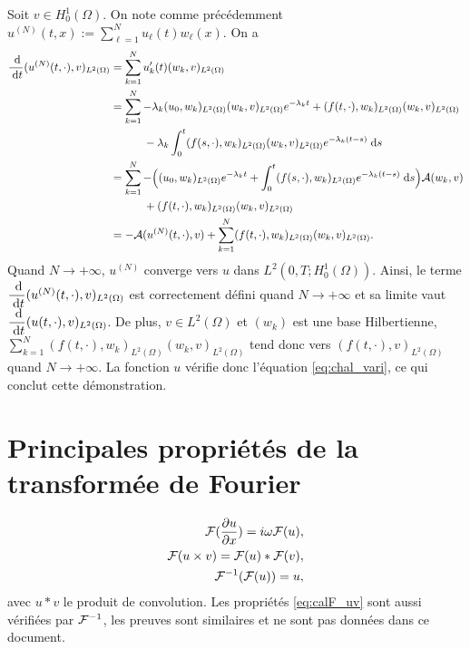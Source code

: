 \documentclass[12pt,a4paper,twoside]{article}
\begin{document}
Soit $v \in H_0^1(\Omega)$. On note comme pr\'ec\'edemment
$u^{(N)} (t,x) := \sum_{\ell=1}^N u_{\ell}(t) w_{\ell}(x)$.
On a 
\begin{align*}
  \dfrac{\;\mathrm{d}}{\;\mathrm{d} t} ( u^{(N)}(t,\cdot) , v )_{L^2(\Omega)}
  &= \sum_{k=1}^N u_k'(t) (w_k , v )_{L^2(\Omega)}
  \\
  &= \sum_{k=1}^N - \lambda_k (u_0 , w_k)_{L^2(\Omega)} (w_k , v )_{L^2(\Omega)} e^{-\lambda_k t}
    + ( f(t,\cdot) , w_k )_{L^2(\Omega)} ( w_k , v )_{L^2(\Omega)}
  \\
  & \qquad \quad 
    - \lambda_k \int_{0}^t (f(s,\cdot) , w_k)_{L^2(\Omega)} ( w_k , v )_{L^2(\Omega)} 
    e^{-\lambda_k (t-s)} \;\mathrm{d} s
  \\
  &= \sum_{k=1}^N - \Big( (u_0 , w_k)_{L^2(\Omega)} e^{-\lambda_k t} 
    + \int_{0}^t (f(s,\cdot) , w_k)_{L^2(\Omega)} e^{-\lambda_k (t-s)} \;\mathrm{d} s  \Big)
    \mathcal{A}(w_k , v)
  \\
  & \qquad \quad 
    + ( f(t,\cdot) , w_k )_{L^2(\Omega)} ( w_k , v )_{L^2(\Omega)}
  \\
  &= - \mathcal{A}(u^{(N)}(t,\cdot) , v) 
    + \sum_{k=1}^N ( f(t,\cdot) , w_k )_{L^2(\Omega)} ( w_k , v )_{L^2(\Omega)} .
\end{align*}
Quand $N \to +\infty$, $u^{(N)}$ converge vers $u$ dans $L^2(0,T;H^1_0(\Omega))$.
Ainsi, le terme $\dfrac{\;\mathrm{d}}{\;\mathrm{d} t}( u^{(N)}(t,\cdot) , v)_{L^2(\Omega)}$
est correctement d\'efini quand $N \to +\infty$ et sa limite vaut 
$\dfrac{\;\mathrm{d}}{\;\mathrm{d} t}(u(t,\cdot) , v)_{L^2(\Omega)}$.
De plus, $v \in L^2(\Omega)$ et $(w_k)$ est une base Hilbertienne,
$\sum_{k=1}^N ( f(t,\cdot) , w_k )_{L^2(\Omega)} ( w_k , v )_{L^2(\Omega)}$
tend donc vers $(f(t,\cdot),v)_{L^2(\Omega)}$ quand $N \to +\infty$.
La fonction $u$ v\'erifie donc l'\'equation \eqref{eq:chal_vari},
ce qui conclut cette d\'emonstration.


\appendix
\section{Principales propri\'et\'es de la transform\'ee de Fourier}

\begin{align}
  \mathcal{F}(\dfrac{\partial u}{\partial x}) = i \omega \mathcal{F}(u) ,
  \\
  \label{eq:calF_uv}
  \mathcal{F}(u \times v) = \mathcal{F}(u) * \mathcal{F}(v) ,
  \\
  \mathcal{F}^{-1}(\mathcal{F}(u)) = u ,
\end{align}
avec $u*v$ le produit de convolution.
Les propri\'et\'es \eqref{eq:calF_uv} sont aussi v\'erifi\'ees par $\mathcal{F}^{-1}$,
les preuves sont similaires et ne sont pas donn\'ees dans ce document.
\end{document}

